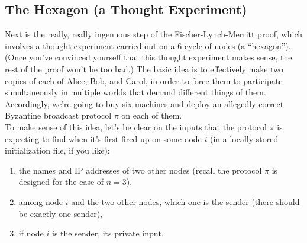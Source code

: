 \subsection{The Hexagon (a Thought Experiment)}
Next is the really, really ingenuous step of the Fischer-Lynch-Merritt proof, which involves a
thought experiment carried out on a 6-cycle of nodes (a “hexagon”). (Once you've convinced
yourself that this thought experiment makes sense, the rest of the proof won’t be too bad.)
The basic idea is to effectively make two copies of each of Alice, Bob, and Carol, in
order to force them to participate simultaneously in multiple worlds that demand different
things of them. Accordingly, we’re going to buy six machines and deploy an allegedly correct
Byzantine broadcast protocol $\pi$ on each of them.\\
To make sense of this idea, let’s be clear on the inputs that the protocol $\pi$ is expecting
to find when it’s first fired up on some node $i$ (in a locally stored initialization file, if you
like):\\
\begin{enumerate}[label=(\alph*)]
    \item the names and IP addresses of two other nodes (recall the protocol $\pi$ is designed for
the case of $n = 3$),
    \item among node $i$ and the two other nodes, which one is the sender (there should be exactly
one sender),
    \item if node $i$ is the sender, its private input.
\end{enumerate}

